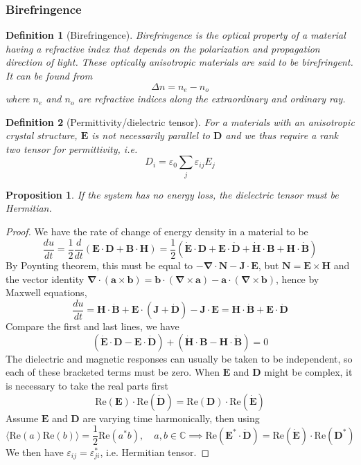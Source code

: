 \documentclass[a4paper]{article}
\newtheorem{defi}{Definition}[section]
\newtheorem{prop}{Proposition}[section]
\theoremstyle{new}
\begin{document}
\subsubsection{Birefringence}
\begin{defi}[Birefringence]
Birefringence is the optical property of a material having a refractive index that depends on the polarization and propagation direction of light. These optically anisotropic materials are said to be birefringent. It can be found from
$$\Delta n=n_e-n_o$$
where $n_e$ and $n_o$ are refractive indices along the extraordinary and ordinary ray.
\end{defi}
\begin{defi}[Permittivity/dielectric tensor]
For a materials with an anisotropic crystal structure, $\mathbf{E}$ is not necessarily parallel to $\mathbf{D}$ and we thus require a rank two tensor for permittivity, i.e.
$$D_i=\varepsilon_0\sum_j\varepsilon_{ij}E_j$$
\end{defi}
\begin{prop}
If the system has no energy loss, the dielectric tensor must be Hermitian.
\end{prop}
\begin{proof}
We have the rate of change of energy density in a material to be
$$\frac{du}{dt}=\frac{1}{2}\frac{d}{dt}(\mathbf{E}\cdot\mathbf{D}+\mathbf{B}\cdot\mathbf{H})=\frac{1}{2}(\mathbf{\dot{E}}\cdot\mathbf{D}+\mathbf{E}\cdot\mathbf{\dot{D}}+\mathbf{\dot{H}}\cdot\mathbf{B}+\mathbf{H}\cdot\mathbf{\dot{B}})$$
By Poynting theorem, this must be equal to $-\boldsymbol{\nabla}\cdot\mathbf{N}-\mathbf{J}\cdot\mathbf{E}$, but $\mathbf{N}=\mathbf{E}\times\mathbf{H}$ and the vector identity $\boldsymbol{\nabla}\cdot(\mathbf{a}\times\mathbf{b})=\mathbf{b}\cdot(\boldsymbol{\nabla}\times\mathbf{a})-\mathbf{a}\cdot(\boldsymbol{\nabla}\times\mathbf{b})$, hence by Maxwell equations,
$$\frac{du}{dt}=\mathbf{H}\cdot\mathbf{\dot{B}}+\mathbf{E}\cdot(\mathbf{J}+\mathbf{\dot{D}})-\mathbf{J}\cdot\mathbf{E}=\mathbf{H}\cdot\mathbf{\dot{B}}+\mathbf{E}\cdot\mathbf{\dot{D}}$$
Compare the first and last lines, we have
$$(\mathbf{\dot{E}}\cdot\mathbf{D}-\mathbf{E}\cdot\mathbf{\dot{D}})+(\mathbf{\dot{H}}\cdot\mathbf{B}-\mathbf{H}\cdot\mathbf{\dot{B}})=0$$
The dielectric and magnetic responses can usually be taken to be independent, so each of these bracketed terms must be zero. When $\mathbf{E}$ and $\mathbf{D}$ might be complex, it is necessary to take the real parts first
$$\text{Re}(\mathbf{E})\cdot\text{Re}(\mathbf{\dot{D}})=\text{Re}(\mathbf{D})\cdot\text{Re}(\mathbf{\dot{E}})$$
Assume $\mathbf{E}$ and $\mathbf{D}$ are varying time harmonically, then using 
$$\langle\text{Re}(a)\text{Re}(b)\rangle=\frac{1}{2}\text{Re}(a^*b),\quad a,b\in\mathbb{C}\implies\text{Re}(\mathbf{E^*}\cdot\mathbf{\dot{D}})=\text{Re}(\mathbf{\dot{E}})\cdot\text{Re}(\mathbf{D^*})$$
We then have $\varepsilon_{ij}=\varepsilon_{ji}^*$, i.e. Hermitian tensor.
\end{proof}
\end{document}
